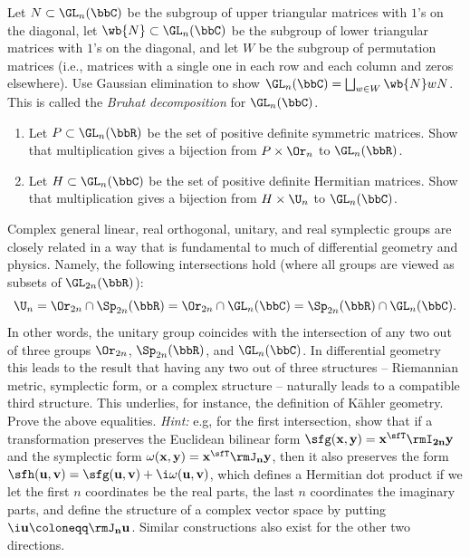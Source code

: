 \begin{xca}
    Let $N\subset \GL_n(\bbC)$ be the subgroup of upper triangular matrices with $1$'s on the diagonal, let $\wb{N}\subset \GL_n(\bbC)$ be the subgroup of lower triangular matrices with $1$'s on the diagonal, and let $W$ be the subgroup of permutation matrices (i.e., matrices with a single one in each row and each column and zeros elsewhere). Use Gaussian elimination to show $\GL_n(\bbC)=\bigsqcup_{w\in W}\wb{N}wN$. This is called the \emph{Bruhat decomposition} for $\GL_n(\bbC)$.
\end{xca}

\begin{xca}
    \begin{enumerate}[label=(\alph*)]
        \item Let $P\subset \GL_n(\bbR)$ be the set of positive definite symmetric matrices. Show that multiplication gives a bijection from $P\times \Or_n$ to $\GL_n(\bbR)$.
        \item Let $H\subset \GL_n(\bbC)$ be the set of positive definite Hermitian matrices. Show that multiplication gives a bijection from $H\times\U_n$ to $\GL_n(\bbC)$.
    \end{enumerate}
\end{xca}

\begin{xca}
    Complex general linear, real orthogonal, unitary, and real symplectic groups are closely related in a way that is fundamental to much of differential geometry and physics. Namely, the following intersections hold (where all groups are viewed as subsets of $\GL_{2n}(\bbR)$):
    \[\U_n=\Or_{2n}\cap \Sp_{2n}(\bbR)=\Or_{2n}\cap \GL_{n}(\bbC)=\Sp_{2n}(\bbR)\cap \GL_{n}(\bbC). \]
    In other words, the unitary group coincides with the intersection of any two out of three groups $\Or_{2n}$, $\Sp_{2n}(\bbR)$, and $\GL_{n}(\bbC)$. In differential geometry this leads to the result that having any two out of three structures -- Riemannian metric, symplectic form, or a complex structure -- naturally leads to a compatible third structure. This underlies, for instance, the definition of K\"ahler geometry. Prove the above equalities. \emph{Hint:} e.g, for the first intersection, show that if a transformation preserves the Euclidean bilinear form $\sfg(\bf x,\bf y)=\bf x^\sfT \rmI_{2n}\bf y$ and the symplectic form $\omega(\bf x,\bf y)=\bf x^\sfT \rmJ_n \bf y$, then it also preserves the form $\sfh(\bf u,\bf v)=\sfg(\bf u,\bf v)+\i\omega(\bf u,\bf v)$, which defines a Hermitian dot product if we let the first $n$ coordinates be the real parts, the last $n$ coordinates the imaginary parts, and define the structure of a complex vector space by putting $\i\bf u\coloneqq \rmJ_n \bf u$. Similar constructions also exist for the other two directions.
\end{xca}







